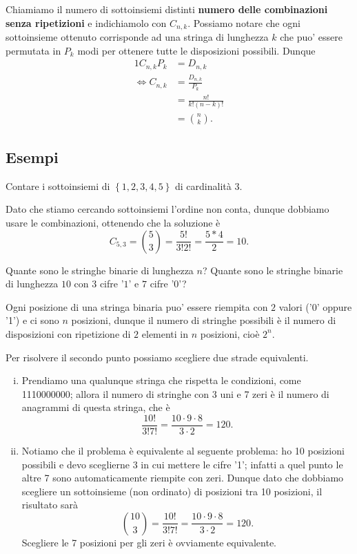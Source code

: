 Chiamiamo il numero di sottoinsiemi distinti \textbf{numero delle combinazioni senza ripetizioni} e indichiamolo con $C_{n, k}$. Possiamo notare che ogni sottoinsieme ottenuto corrisponde ad una stringa di lunghezza $k$ che puo' essere permutata in $P_k$ modi per ottenere tutte le disposizioni possibili. Dunque \begin{alignat*}
    {1}
    C_{n, k}P_k   &= D_{n, k}  \\
    \iff C_{n, k} &= \frac{D_{n,k}}{P_k}\\
                  &= \frac{n!}{k!(n-k)!} \\
                  &= \binom{n}{k}.
\end{alignat*}

\subsection{Esempi}

\begin{example}
    Contare i sottoinsiemi di $\left\{ 1, 2, 3, 4, 5\right\}$ di cardinalità $3$.
\end{example}
\begin{solution}
    Dato che stiamo cercando sottoinsiemi l'ordine non conta, dunque dobbiamo usare le combinazioni, ottenendo che la soluzione è \[
        C_{5, 3} = \binom{5}{3} =  \frac{5!}{3!2!} = \frac{5*4}{2} = 10
    .\]
\end{solution}

\begin{example}
    Quante sono le stringhe binarie di lunghezza $n$? Quante sono le stringhe binarie di lunghezza $10$ con $3$ cifre '$1$' e $7$ cifre '$0$'?
\end{example}
\begin{solution}
    Ogni posizione di una stringa binaria puo' essere riempita con $2$ valori ('0' oppure '1') e ci sono $n$ posizioni, dunque il numero di stringhe possibili è il numero di disposizioni con ripetizione di $2$ elementi in $n$ posizioni, cioè $2^n$.

    Per risolvere il secondo punto possiamo scegliere due strade equivalenti.
    \begin{enumerate}[(i)]
        \item Prendiamo una qualunque stringa che rispetta le condizioni, come 1110000000; allora il numero di stringhe con 3 uni e 7 zeri è il numero di anagrammi di questa stringa, che è \[
            \frac{10!}{3!7!} = \frac{10 \cdot 9 \cdot 8}{3 \cdot 2} = 120.   
        \]
        \item Notiamo che il problema è equivalente al seguente problema: ho 10 posizioni possibili e devo sceglierne 3 in cui mettere le cifre '1'; infatti a quel punto le altre 7 sono automaticamente riempite con zeri. Dunque dato che dobbiamo scegliere un sottoinsieme (non ordinato) di posizioni tra 10 posizioni, il risultato sarà \[
            \binom{10}{3} = \frac{10!}{3!7!} = \frac{10 \cdot 9 \cdot 8}{3 \cdot 2} = 120.   
        \]
        Scegliere le 7 posizioni per gli zeri è ovviamente equivalente.
    \end{enumerate}
\end{solution}

